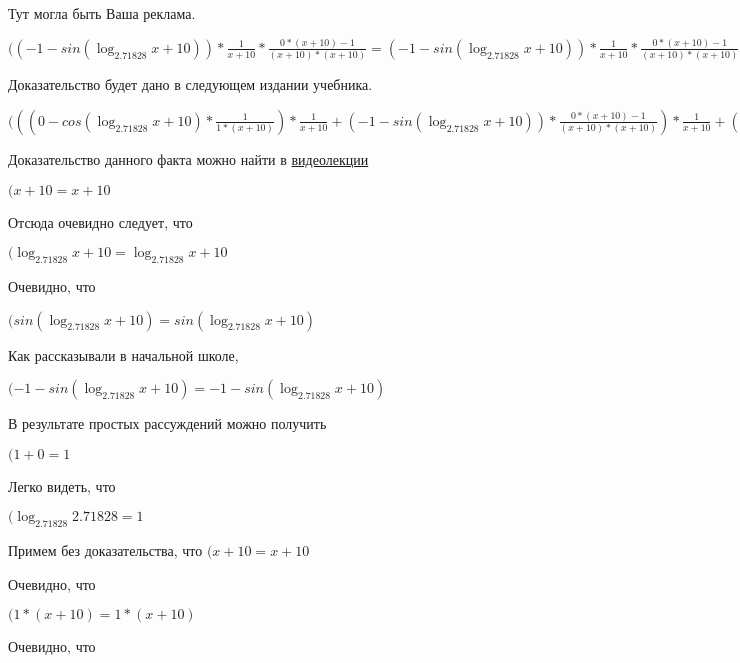 \documentclass[12pt,a4paper,fleqn]{article}
\theoremstyle{definition}
\begin{document}
Тут могла быть Ваша реклама.

$(( -1  - sin(\log_{ 2.71828 }{ x  +  10 })) * \frac{ 1 }{ x  +  10 }
 * \frac{ 0  * ( x  +  10 ) -  1 }{( x  +  10 ) * ( x  +  10 )}
 = ( -1  - sin(\log_{ 2.71828 }{ x  +  10 })) * \frac{ 1 }{ x  +  10 }
 * \frac{ 0  * ( x  +  10 ) -  1 }{( x  +  10 ) * ( x  +  10 )}
$

Доказательство будет дано в следующем издании учебника.

$((( 0  - cos(\log_{ 2.71828 }{ x  +  10 }) * \frac{ 1 }{ 1  * ( x  +  10 )}
) * \frac{ 1 }{ x  +  10 }
 + ( -1  - sin(\log_{ 2.71828 }{ x  +  10 })) * \frac{ 0  * ( x  +  10 ) -  1 }{( x  +  10 ) * ( x  +  10 )}
) * \frac{ 1 }{ x  +  10 }
 + ( -1  - sin(\log_{ 2.71828 }{ x  +  10 })) * \frac{ 1 }{ x  +  10 }
 * \frac{ 0  * ( x  +  10 ) -  1 }{( x  +  10 ) * ( x  +  10 )}
 = (( 0  - cos(\log_{ 2.71828 }{ x  +  10 }) * \frac{ 1 }{ 1  * ( x  +  10 )}
) * \frac{ 1 }{ x  +  10 }
 + ( -1  - sin(\log_{ 2.71828 }{ x  +  10 })) * \frac{ 0  * ( x  +  10 ) -  1 }{( x  +  10 ) * ( x  +  10 )}
) * \frac{ 1 }{ x  +  10 }
 + ( -1  - sin(\log_{ 2.71828 }{ x  +  10 })) * \frac{ 1 }{ x  +  10 }
 * \frac{ 0  * ( x  +  10 ) -  1 }{( x  +  10 ) * ( x  +  10 )}
$

Доказательство данного факта можно найти в \href{https://www.youtube.com/watch?v=dQw4w9WgXcQ}{видеолекции}

$( x  +  10  =  x  +  10 $

Отсюда очевидно следует, что

$(\log_{ 2.71828 }{ x  +  10 } = \log_{ 2.71828 }{ x  +  10 }$

Очевидно, что

$(sin(\log_{ 2.71828 }{ x  +  10 }) = sin(\log_{ 2.71828 }{ x  +  10 })$

Как рассказывали в начальной школе,

$( -1  - sin(\log_{ 2.71828 }{ x  +  10 }) =  -1  - sin(\log_{ 2.71828 }{ x  +  10 })$

В результате простых рассуждений можно получить

$( 1  +  0  =  1 $

Легко видеть, что

$(\log_{ 2.71828 }{ 2.71828 } =  1 $

Примем без доказательства, что
$( x  +  10  =  x  +  10 $

Очевидно, что

$( 1  * ( x  +  10 ) =  1  * ( x  +  10 )$

Очевидно, что
\end{document}
